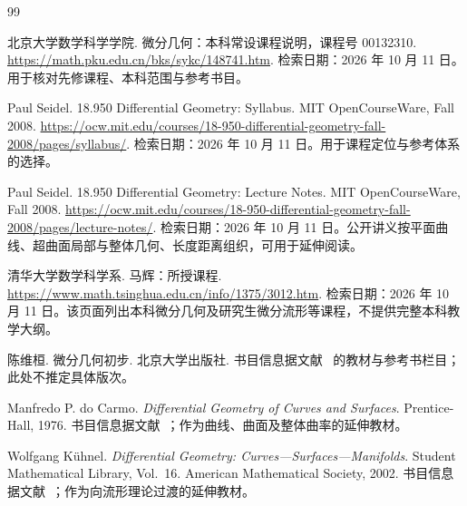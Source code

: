 \documentclass[UTF8,12pt,a4paper,fontset=fandol]{ctexbook}
\begin{document}
\backmatter
\begin{thebibliography}{99}

北京大学数学科学学院. 微分几何：本科常设课程说明，课程号 00132310.
\url{https://math.pku.edu.cn/bks/sykc/148741.htm}.
检索日期：2026 年 10 月 11 日。用于核对先修课程、本科范围与参考书目。

Paul Seidel. 18.950 Differential Geometry: Syllabus. MIT OpenCourseWare, Fall 2008.
\url{https://ocw.mit.edu/courses/18-950-differential-geometry-fall-2008/pages/syllabus/}.
检索日期：2026 年 10 月 11 日。用于课程定位与参考体系的选择。

Paul Seidel. 18.950 Differential Geometry: Lecture Notes. MIT OpenCourseWare, Fall 2008.
\url{https://ocw.mit.edu/courses/18-950-differential-geometry-fall-2008/pages/lecture-notes/}.
检索日期：2026 年 10 月 11 日。公开讲义按平面曲线、超曲面局部与整体几何、长度距离组织，可用于延伸阅读。

清华大学数学科学系. 马辉：所授课程.
\url{https://www.math.tsinghua.edu.cn/info/1375/3012.htm}.
检索日期：2026 年 10 月 11 日。该页面列出本科微分几何及研究生微分流形等课程，不提供完整本科教学大纲。

陈维桓. 微分几何初步. 北京大学出版社.
书目信息据文献~\cite{pku-course} 的教材与参考书栏目；此处不推定具体版次。

Manfredo P. do Carmo. \textit{Differential Geometry of Curves and Surfaces}.
Prentice-Hall, 1976.
书目信息据文献~\cite{mit-syllabus}；作为曲线、曲面及整体曲率的延伸教材。

Wolfgang K\"uhnel. \textit{Differential Geometry: Curves---Surfaces---Manifolds}.
Student Mathematical Library, Vol.~16. American Mathematical Society, 2002.
书目信息据文献~\cite{mit-syllabus}；作为向流形理论过渡的延伸教材。

\end{thebibliography}
\end{document}
